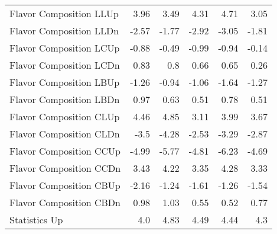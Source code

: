 \begin{table}[htbp]
{\begin{tabular}{lrrrrr}
Flavor Composition LLUp                               & 3.96               & 3.49                 & 4.31                 & 4.71                 & 3.05                 \\
Flavor Composition LLDn                               & -2.57              & -1.77                & -2.92                & -3.05                & -1.81                \\
Flavor Composition LCUp                               & -0.88              & -0.49                & -0.99                & -0.94                & -0.14                \\
Flavor Composition LCDn                               & 0.83               & 0.8                  & 0.66                 & 0.65                 & 0.26                 \\
Flavor Composition LBUp                               & -1.26              & -0.94                & -1.06                & -1.64                & -1.27                \\
Flavor Composition LBDn                               & 0.97               & 0.63                 & 0.51                 & 0.78                 & 0.51                 \\
Flavor Composition CLUp                               & 4.46               & 4.85                 & 3.11                 & 3.99                 & 3.67                 \\
Flavor Composition CLDn                               & -3.5               & -4.28                & -2.53                & -3.29                & -2.87                \\
Flavor Composition CCUp                               & -4.99              & -5.77                & -4.81                & -6.23                & -4.69                \\
Flavor Composition CCDn                               & 3.43               & 4.22                 & 3.35                 & 4.28                 & 3.33                 \\
Flavor Composition CBUp                               & -2.16              & -1.24                & -1.61                & -1.26                & -1.54                \\
Flavor Composition CBDn                               & 0.98               & 1.03                 & 0.55                 & 0.52                 & 0.77                 \\
Statistics Up                             & 4.0                & 4.83                 & 4.49                 & 4.44                 & 4.3                  \\

\end{tabular}}
\end{table}
